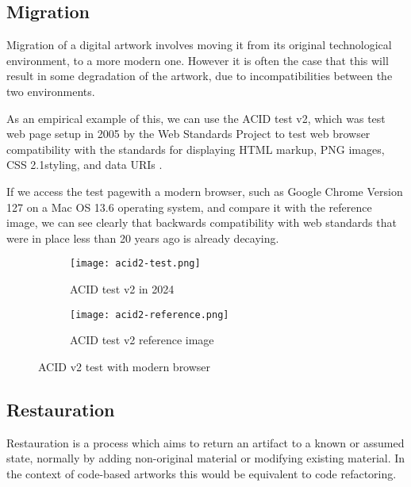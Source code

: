 \subsection{Migration}

Migration of a digital artwork involves moving it from its original technological environment, to a more modern one. However it is often the case that this will result in some degradation of the artwork, due to incompatibilities between the two environments. \cite{huberNewMediaOld2013}

As an empirical example of this, we can use the ACID test v2, which was test web page setup in 2005 by the Web Standards Project to test web browser compatibility with the standards for displaying HTML markup, PNG images, CSS 2.1styling, and data URIs \cite{Acid22024}.

If we access the test page\footnotemark[1] with a modern browser, such as Google Chrome Version 127 on a Mac OS 13.6 operating system, and compare it with the reference image\footnotemark[2], we can see clearly that backwards compatibility with web standards that were in place less than 20 years ago is already decaying.



\begin{figure}[H]
  \centering
  \begin{subfigure}[b]{0.45\textwidth}
    \centering
    \texttt{[image: acid2-test.png]}
    \caption{ACID test v2 in 2024}
    \label{fig:image1}
  \end{subfigure}
  \hfill
  \begin{subfigure}[b]{0.45\textwidth}
    \centering
    \texttt{[image: acid2-reference.png]}
    \caption{ACID test v2 reference image}
    \label{fig:image2}
  \end{subfigure}
  \caption{ACID v2 test with modern browser}
  \label{fig:acid2-test}
\end{figure}


\subsection{Restauration}

Restauration is a process which aims to return an artifact to a known or assumed state, normally by adding non-original material or modifying existing material. In the context of code-based artworks this would be equivalent to code refactoring.

